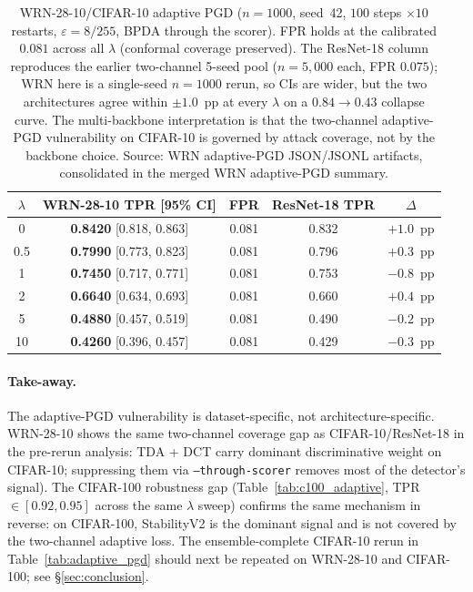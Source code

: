 \begin{table}[h]
\centering
\small
\begin{tabular}{ccccc}
\toprule
$\lambda$ & WRN-28-10 TPR [95\% CI] & FPR & ResNet-18 TPR & $\Delta$ \\
\midrule
0    & \textbf{0.8420} [0.818, 0.863] & 0.081 & 0.832 & $+1.0$~pp \\
0.5  & \textbf{0.7990} [0.773, 0.823] & 0.081 & 0.796 & $+0.3$~pp \\
1    & \textbf{0.7450} [0.717, 0.771] & 0.081 & 0.753 & $-0.8$~pp \\
2    & \textbf{0.6640} [0.634, 0.693] & 0.081 & 0.660 & $+0.4$~pp \\
5    & \textbf{0.4880} [0.457, 0.519] & 0.081 & 0.490 & $-0.2$~pp \\
10   & \textbf{0.4260} [0.396, 0.457] & 0.081 & 0.429 & $-0.3$~pp \\
\bottomrule
\end{tabular}
\caption{WRN-28-10/CIFAR-10 adaptive PGD ($n{=}1000$, seed~42,
$100$ steps $\times 10$ restarts, $\varepsilon{=}8/255$, BPDA through
the scorer). FPR holds at the calibrated $0.081$ across all
$\lambda$ (conformal coverage preserved). The ResNet-18 column
reproduces the earlier two-channel 5-seed pool
($n{=}5{,}000$ each, FPR $0.075$); WRN here is a single-seed
$n{=}1000$ rerun, so CIs are wider, but the two architectures
agree within $\pm 1.0$~pp at every $\lambda$ on a $0.84 \to 0.43$
collapse curve. The multi-backbone interpretation is that
the two-channel adaptive-PGD vulnerability on CIFAR-10 is governed by
attack coverage, not by the backbone choice. Source: WRN adaptive-PGD
JSON/JSONL artifacts, consolidated in the merged WRN adaptive-PGD
summary.}
\label{tab:wrn_adaptive}
\end{table}

\paragraph{Take-away.}
The adaptive-PGD vulnerability is dataset-specific, not
architecture-specific. WRN-28-10 shows the same two-channel coverage
gap as CIFAR-10/ResNet-18 in the pre-rerun analysis: TDA + DCT carry
dominant discriminative weight on CIFAR-10; suppressing them via
\texttt{--through-scorer} removes most of the detector's signal).
The CIFAR-100 robustness gap (Table~\ref{tab:c100_adaptive},
TPR $\in [0.92, 0.95]$ across the same $\lambda$ sweep) confirms the
same mechanism in reverse: on CIFAR-100, StabilityV2 is the
dominant signal and is not covered by the two-channel adaptive loss.
The ensemble-complete CIFAR-10 rerun in Table~\ref{tab:adaptive_pgd}
should next be repeated on WRN-28-10 and CIFAR-100; see
\S\ref{sec:conclusion}.

